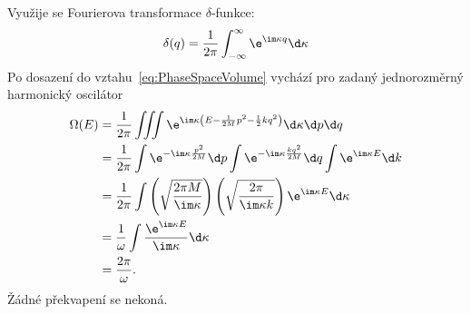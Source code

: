\begin{solution}
    Využije se Fourierova transformace $\delta$-funkce:
    \begin{equation}
        \delta(q)
            =\frac{1}{2\pi}\int_{-\infty}^{\infty}\e^{\im\kappa q}\d\kappa
    \end{equation}
    Po dosazení do vztahu~\eqref{eq:PhaseSpaceVolume} vychází pro zadaný jednorozměrný harmonický oscilátor
    \begin{align}
        \Omega(E)
            &=\frac{1}{2\pi}\iiint\e^{\im\kappa\left(E-\frac{1}{2M}p^{2}-\frac{1}{2}kq^{2}\right)}\d\kappa\d p\d q\nonumber\\
            &=\frac{1}{2\pi}\int\e^{-\im\kappa\frac{p^{2}}{2M}}\d p
                \int\e^{-\im\kappa\frac{kq^{2}}{2M}}\d q
                \int\e^{\im\kappa E}\d k\nonumber\\
            &=\frac{1}{2\pi}\int\left(\sqrt{\frac{2\pi M}{\im\kappa}}\right)
                \left(\sqrt{\frac{2\pi}{\im\kappa k}}\right)\e^{\im\kappa E}\d\kappa\nonumber\\
            &=\frac{1}{\omega}\int\frac{\e^{\im\kappa E}}{\im\kappa}\d\kappa\nonumber\\
            &=\frac{2\pi}{\omega}.
    \end{align}
    Žádné překvapení se nekoná.
\end{solution}
